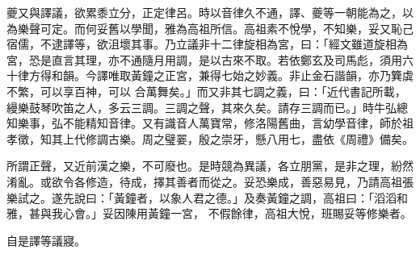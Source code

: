 \begin{pinyinscope}
 夔又與譯議，欲累黍立分，正定律呂。時以音律久不通，譯、夔等一朝能為之，以為樂聲可定。而何妥舊以學聞，雅為高祖所信。高祖素不悅學，不知樂，妥又恥己宿儒，不逮譯等，欲沮壞其事。乃立議非十二律旋相為宮，曰：「經文雖道旋相為宮，恐是直言其理，亦不通隨月用調，是以古來不取。若依鄭玄及司馬彪，須用六十律方得和韻。今譯唯取黃鐘之正宮，兼得七始之妙義。非止金石諧韻，亦乃簨虡不繁，可以享百神，可以
 合萬舞矣。」而又非其七調之義，曰：「近代書記所載，縵樂鼓琴吹笛之人，多云三調。三調之聲，其來久矣。請存三調而已。」時牛弘總知樂事，弘不能精知音律。又有識音人萬寶常，修洛陽舊曲，言幼學音律，師於祖孝徵，知其上代修調古樂。周之璧翣，殷之崇牙，懸八用七，盡依《周禮》備矣。



 所謂正聲，又近前漢之樂，不可廢也。是時競為異議，各立朋黨，是非之理，紛然淆亂。或欲令各修造，待成，擇其善者而從之。妥恐樂成，善惡易見，乃請高祖張樂試之。遂先說曰：「黃鐘者，以象人君之德。」及奏黃鐘之調，高祖曰：「滔滔和雅，甚與我心會。」妥因陳用黃鐘一宮，
 不假餘律，高祖大悅，班賜妥等修樂者。



 自是譯等議寢。



\end{pinyinscope}